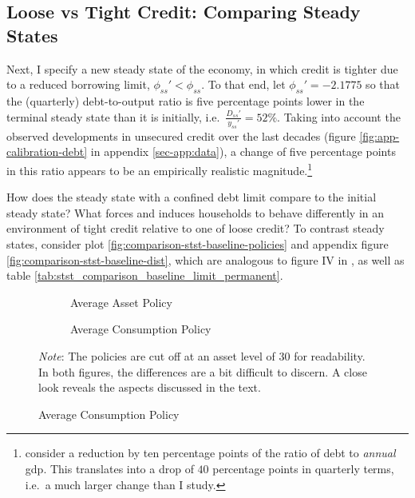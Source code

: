 \documentclass[a4paper,12pt]{article} %
\numberwithin{equation}{section} %
\numberwithin{figure}{section}
\numberwithin{table}{section}
\begin{document}
\subsection{Loose vs Tight Credit: Comparing Steady States}
\label{sec:limit-stst-tight}

Next, I specify a new steady state of the economy, in which credit is tighter due to a reduced borrowing limit, $\phi_{ss}' < \phi_{ss}$. To that end, let $\phi_{ss}' = -2.1775$ so that the (quarterly) debt-to-output ratio is five percentage points lower in the terminal steady state than it is initially, i.e.~$\frac{D_{ss}'}{y_{ss}'} = 52\%$. Taking into account the observed developments in unsecured credit over the last decades (figure \ref{fig:app-calibration-debt} in appendix \ref{sec-app:data}), a change of five percentage points in this ratio appears to be an empirically realistic magnitude.\footnote{\textcite{gl2017} consider a reduction by ten percentage points of the ratio of debt to \textit{annual} \Gls{gdp}. This translates into a drop of $40$ percentage points in quarterly terms, i.e.~a much larger change than I study.} 

How does the steady state with a confined debt limit compare to the initial steady state? What forces and induces households to behave differently in an environment of tight credit relative to one of loose credit? To contrast steady states, consider plot \ref{fig:comparison-stst-baseline-policies} and appendix figure \ref{fig:comparison-stst-baseline-dist}, which are analogous to figure IV in \textcite[p.1443]{gl2017}, as well as table \ref{tab:stst_comparison_baseline_limit_permanent}. 

\begin{figure}[t]
    \caption{Baseline Model -- Shock to Borrowing Limit: Household Policies}
    \label{fig:comparison-stst-baseline-policies}
    \centering
    \begin{subfigure}[b]{0.49\textwidth}
    \caption{Average Asset Policy}
    \label{fig:comparison-stst-baseline-policies-a}
         \centering
         
     \end{subfigure}
     \hfill
     \begin{subfigure}[b]{0.49\textwidth}
     \caption{Average Consumption Policy}
     \label{fig:comparison-stst-baseline-policies-c}
         \centering
         
     \end{subfigure}

    \vspace{10pt}
     
     \justifying
     \footnotesize
	\textit{Note}: The policies are cut off at an asset level of $30$ for readability. In both figures, the differences are a bit difficult to discern. A close look reveals the aspects discussed in the text.
\end{figure}
\end{document}
